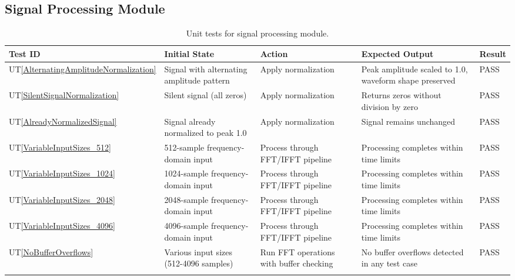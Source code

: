 \documentclass[12pt, titlepage]{article}
\newcommand{\utref}[1]{UT\ref{#1}}
\begin{document}
\subsection{Signal Processing Module}
{\footnotesize
\begin{longtable}{|p{0.8cm}|p{3.5cm}|p{3.5cm}|p{3.5cm}|p{1cm}|}
    \hline
    \textbf{Test ID} & \textbf{Initial State} & \textbf{Action} &
    \textbf{Expected Output} & \textbf{Result} \\ 
    \endfirsthead
    \hline

    \utref{AlternatingAmplitudeNormalization} & Signal with alternating
    amplitude pattern & Apply normalization & Peak amplitude scaled to 1.0,
    waveform shape preserved & PASS\\ \hline
    \utref{SilentSignalNormalization} & Silent signal (all zeros) & Apply
    normalization & Returns zeros without division by zero & PASS\\ \hline
    \utref{AlreadyNormalizedSignal} & Signal already normalized to peak 1.0 &
    Apply normalization & Signal remains unchanged & PASS\\ \hline
    \utref{VariableInputSizes_512} & 512-sample frequency-domain input & Process
    through FFT/IFFT pipeline & Processing completes within time limits & PASS\\
    \hline
    \utref{VariableInputSizes_1024} & 1024-sample frequency-domain input &
    Process through FFT/IFFT pipeline & Processing completes within time limits
    & PASS\\ \hline
    \utref{VariableInputSizes_2048} & 2048-sample frequency-domain input &
    Process through FFT/IFFT pipeline & Processing completes within time limits
    & PASS\\ \hline
    \utref{VariableInputSizes_4096} & 4096-sample frequency-domain input &
    Process through FFT/IFFT pipeline & Processing completes within time limits
    & PASS\\ \hline
    \utref{NoBufferOverflows} & Various input sizes (512-4096 samples) & Run FFT
    operations with buffer checking & No buffer overflows detected in any test
    case & PASS\\ \hline

    \caption{Unit tests for signal processing module.}
    \label{tab:unit_test_signal_processing}
\end{longtable}
}

\end{document}
